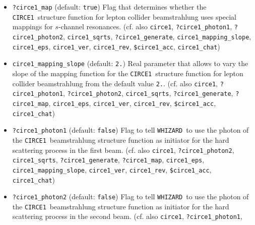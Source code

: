 \documentclass[12pt]{book}
\newcommand{\ttt}[1]{\texttt{#1}}
\newcommand{\whizard}{\texttt{WHIZARD}}
\newcommand{\circeone}{\texttt{CIRCE1}}
\begin{document}
\begin{itemize}
spectrum, or a pre-defined (semi-)analytical parameterization. Default
is the generator mode. (cf. also \ttt{circe1}, \ttt{?circe1\_photon1},
\newline \ttt{?circe1\_photon2},  \ttt{circe1\_sqrts},
\ttt{?circe1\_map}, \ttt{circe1\_mapping\_slope}, \ttt{circe1\_eps},
\newline \ttt{circe1\_ver}, \ttt{circe1\_rev}, \ttt{\$circe1\_acc},
\ttt{circe1\_chat}) 
\item
\ttt{?circe1\_map} \qquad (default: \ttt{true}) \newline
Flag that determines whether the \circeone\ structure function for
lepton collider beamstrahlung uses special mappings for $s$-channel
resonances. (cf. also \ttt{circe1}, \ttt{?circe1\_photon1},
\newline \ttt{?circe1\_photon2},  \ttt{circe1\_sqrts},
\ttt{?circe1\_generate}, \ttt{circe1\_mapping\_slope}, \ttt{circe1\_eps},
\newline \ttt{circe1\_ver}, \ttt{circe1\_rev}, \ttt{\$circe1\_acc},
\ttt{circe1\_chat}) 
\item
\ttt{circe1\_mapping\_slope} \qquad (default: \ttt{2.}) \newline
Real parameter that allows to vary the slope of the mapping function
for the \circeone\ structure function for lepton collider
beamstrahlung from the default value \ttt{2.}. (cf. also
\ttt{circe1}, \ttt{?circe1\_photon1}, \ttt{?circe1\_photon2}, 
\ttt{circe1\_sqrts},  \ttt{?circe1\_generate}, \ttt{?circe1\_map},
\ttt{circe1\_eps}, \ttt{circe1\_ver}, \ttt{circe1\_rev},
\ttt{\$circe1\_acc}, \ttt{circe1\_chat}) 
\item
\ttt{?circe1\_photon1} \qquad (default: \ttt{false}) \newline
Flag to tell \whizard\ to use the photon of the \circeone\
beamstrahlung structure function as initiator for the hard scattering
process in the first beam. (cf. also \ttt{circe1}, \ttt{?circe1\_photon2},
\ttt{circe1\_sqrts},  \ttt{?circe1\_generate}, \ttt{?circe1\_map},
\ttt{circe1\_eps}, \newline \ttt{circe1\_mapping\_slope}, \ttt{circe1\_ver},
\ttt{circe1\_rev}, \ttt{\$circe1\_acc}, \ttt{circe1\_chat})
\item
\ttt{?circe1\_photon2} \qquad (default: \ttt{false}) \newline
Flag to tell \whizard\ to use the photon of the \circeone\
beamstrahlung structure function as initiator for the hard scattering
process in the second beam. (cf. also \ttt{circe1}, \ttt{?circe1\_photon1},

\end{itemize}
\end{document}
